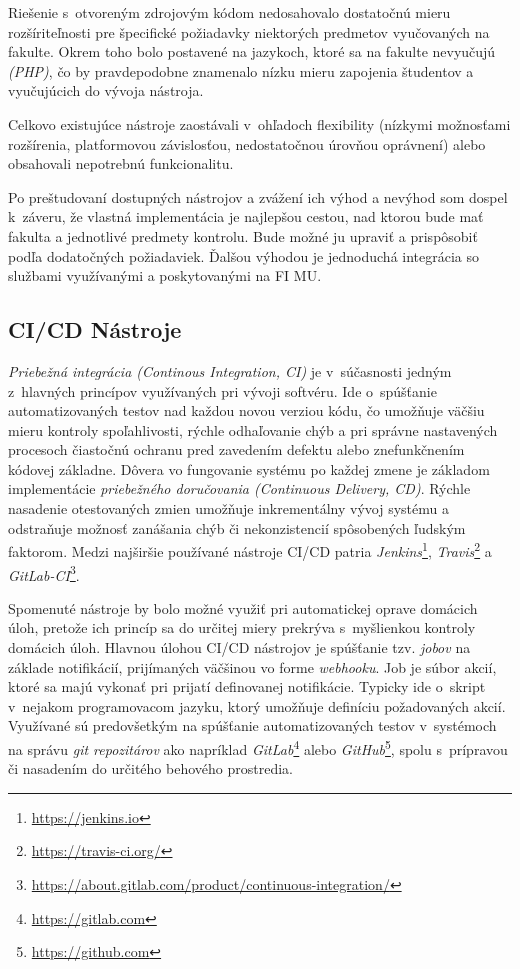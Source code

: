 \documentclass[
  digital, %
  oneside, %
  table,   %
  lof,     %
  lot,   %
]{fithesis3}
\begin{document}
Riešenie s~otvoreným zdrojovým kódom nedosahovalo dostatočnú mieru rozšíriteľnosti pre špecifické požiadavky niektorých predmetov vyučovaných na fakulte. Okrem toho bolo postavené na jazykoch, ktoré sa na fakulte nevyučujú \emph{(PHP)}, čo by pravdepodobne znamenalo nízku mieru zapojenia študentov a vyučujúcich do vývoja nástroja.

Celkovo existujúce nástroje zaostávali v~ohľadoch flexibility (nízkymi možnosťami rozšírenia, platformovou závislosťou, nedostatočnou úrovňou oprávnení) alebo obsahovali nepotrebnú funkcionalitu.

Po preštudovaní dostupných nástrojov a zvážení ich výhod a nevýhod som dospel k~záveru, že vlastná implementácia je najlepšou cestou, nad ktorou bude mať fakulta a jednotlivé predmety kontrolu. Bude možné ju upraviť a prispôsobiť podľa dodatočných požiadaviek. Ďalšou výhodou je jednoduchá integrácia so službami využívanými a poskytovanými na FI MU.

\subsection{CI/CD Nástroje}

\emph{Priebežná integrácia (Continous Integration, CI)}\cite{mfowler-ci} je v~súčasnosti jedným z~hlavných princípov využívaných pri vývoji softvéru. Ide o~spúšťanie automatizovaných testov nad každou novou verziou kódu, čo umožňuje väčšiu mieru kontroly spoľahlivosti, rýchle odhaľovanie chýb a pri správne nastavených procesoch čiastočnú ochranu pred zavedením defektu alebo znefunkčnením kódovej základne. Dôvera vo fungovanie systému po každej zmene je základom implementácie \emph{priebežného doručovania (Continuous Delivery, CD)}\cite{continous-delivery}. Rýchle nasadenie otestovaných zmien umožňuje inkrementálny vývoj systému a odstraňuje možnosť zanášania chýb či nekonzistencií spôsobených ľudským faktorom. Medzi najširšie používané nástroje CI/CD patria \textit{Jenkins}\footnote{\url{https://jenkins.io}}, \textit{Travis}\footnote{\url{https://travis-ci.org/}} a \textit{GitLab-CI}\footnote{\url{https://about.gitlab.com/product/continuous-integration/}}. 

Spomenuté nástroje by bolo možné využiť pri automatickej oprave domácich úloh, pretože ich princíp sa do určitej miery prekrýva s~myšlienkou kontroly domácich úloh. Hlavnou úlohou CI/CD nástrojov je spúšťanie tzv. \emph{jobov} na základe notifikácií, prijímaných väčšinou vo forme \emph{webhooku}. Job je súbor akcií, ktoré sa majú vykonať pri prijatí definovanej notifikácie. Typicky ide o~skript v~nejakom programovacom jazyku, ktorý umožňuje definíciu požadovaných akcií. Využívané sú predovšetkým na spúšťanie automatizovaných testov v~systémoch na správu \emph{git repozitárov} ako napríklad \emph{GitLab}\footnote{\url{https://gitlab.com}} alebo \emph{GitHub}\footnote{\url{https://github.com}}, spolu s~prípravou či nasadením do určitého behového prostredia.  
\end{document}
